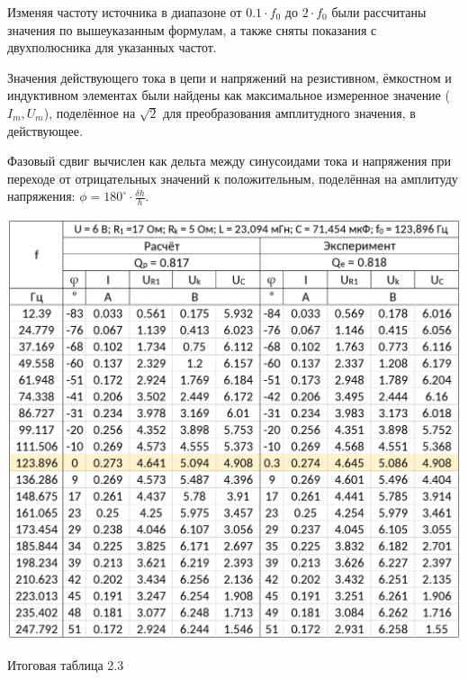 Изменяя частоту источника в диапазоне от $0.1 \cdot f_0$ до $2 \cdot f_0$ были рассчитаны значения по вышеуказанным формулам, а также сняты показания с двухполюсника для указанных частот.

Значения действующего тока в цепи и напряжений на резистивном, ёмкостном и индуктивном элементах были найдены как максимальное измеренное значение ($I_m, U_m$), поделённое на \(\sqrt{2}\) для преобразования амплитудного значения, в действующее.

Фазовый сдвиг вычислен как дельта между синусоидами тока и напряжения при переходе от отрицательных значений к положительным, поделённая на амплитуду напряжения: \( \phi = 180^{\circ} \cdot \frac{\delta h}{h}\).

\begin{table}[H]
	\captionsetup{labelformat=empty}
	\centering
	\includegraphics[width=1\textwidth]{./data/table_2-3.png}
	\caption{Итоговая таблица 2.3}
\end{table}
